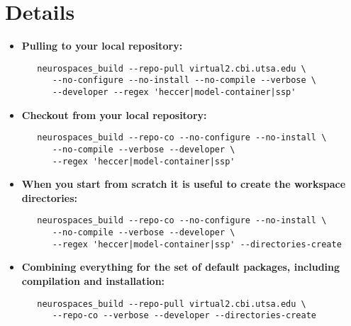 \documentclass[12pt]{article}
\begin{document}
\section*{Details}

\begin{itemize}

\item {\bf Pulling to your local repository:}
\begin{verbatim}
   neurospaces_build --repo-pull virtual2.cbi.utsa.edu \
      --no-configure --no-install --no-compile --verbose \
      --developer --regex 'heccer|model-container|ssp'
\end{verbatim}

\item {\bf Checkout from your local repository:}
\begin{verbatim}
   neurospaces_build --repo-co --no-configure --no-install \
      --no-compile --verbose --developer \
      --regex 'heccer|model-container|ssp'
\end{verbatim}

\item {\bf When you start from scratch it is useful to create the workspace directories:}
\begin{verbatim}
   neurospaces_build --repo-co --no-configure --no-install \
      --no-compile --verbose --developer \
      --regex 'heccer|model-container|ssp' --directories-create
\end{verbatim}

\item {\bf Combining everything for the set of default packages, including compilation and installation:}
\begin{verbatim}
   neurospaces_build --repo-pull virtual2.cbi.utsa.edu \
      --repo-co --verbose --developer --directories-create
\end{verbatim}

\end{itemize}
\end{document}
